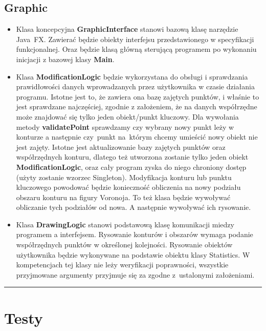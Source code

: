 \documentclass[a4paper,11pt]{article}
\newcommand{\linia}{\rule{\linewidth}{0.4mm}}
\begin{document}
\subsection{Graphic}
\begin{itemize}
\item Klasa koncepcyjna \textbf{GraphicInterface} stanowi bazową klasę narzędzie Java~FX. Zawierać będzie obiekty interfejsu przedstawionego w specyfikacji funkcjonalnej. Oraz będzie klasą główną sterującą programem po wykonaniu inicjacji z bazowej klasy \textbf{Main}.
\item Klasa \textbf{ModificationLogic} będzie wykorzystana do obsługi i sprawdzania prawidłowości danych wprowadzanych przez użytkownika w czasie działania programu. Istotne jest to, że zawiera ona bazę zajętych punktów, i właśnie to jest sprawdzane najczęściej, zgodnie z założeniem, że na danych współrzędne może znajdować się tylko jeden obiekt/punkt kluczowy. Dla wywołania metody \textbf{validatePoint} sprawdzamy czy wybrany nowy punkt leży w konturze a następnie czy~punkt na~którym chcemy umieścić nowy obiekt nie jest zajęty. Istotne jest aktualizowanie bazy zajętych punktów oraz współrzędnych konturu, dlatego też utworzona zostanie tylko jeden obiekt \textbf{ModificationLogic}, oraz cały program zyska do niego chroniony dostęp (użyty zostanie wzorzec Singleton). Modyfikacja konturu lub punktu kluczowego powodować będzie konieczność obliczenia na nowy podziału obszaru konturu na figury Voronoja. To też klasa będzie wywoływać obliczanie tych podziałów od nowa. A następnie wywoływać ich rysowanie.
\item Klasa \textbf{DrawingLogic} stanowi podstawową klasę komunikacji miedzy programem a interfejsem. Rysowanie konturów i obszarów wymaga podanie współrzędnych punktów w określonej kolejności. Rysowanie obiektów użytkownika będzie wykonywane na podstawie obiektu klasy Statistics. W kompetencjach tej klasy nie leży weryfikacji poprawności, wszystkie przyjmowane argumenty przyjmuje się za zgodne z~ustalonymi założeniami. 
\end{itemize}

\noindent\linia

\section{Testy}
\end{document}
